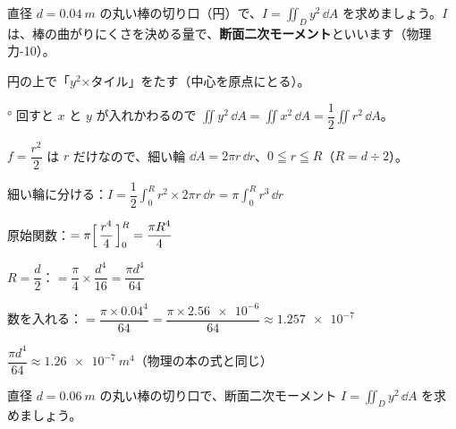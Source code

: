 \begin{reidai}[丸い棒の断面二次モーメント]
直径 $d=\qty{0.04}{m}$ の丸い棒の切り口（円）で、$I=\iint_D y^2\,\dd A$ を求めましょう。$I$ は、棒の曲がりにくさを決める量で、\textbf{断面二次モーメント}といいます（物理 力-10）。\par
\kangaekata {}\par
{}\enspace 円の上で「$y^2$×タイル」をたす（中心を原点にとる）。\par
{}° 回すと $x$ と $y$ が入れかわるので $\iint y^2\,\dd A=\iint x^2\,\dd A=\dfrac{1}{2}\iint r^2\,\dd A$。\par
{}\enspace $f=\dfrac{r^2}{2}$ は $r$ だけなので、細い輪 $\dd A=2\pi r\,\dd r$、$0\leqq r\leqq R$（$R=d\div2$）。\par
\shiki\kviiigs{}\zw{} 細い輪に分ける：$\displaystyle I=\dfrac{1}{2}\int_0^R r^2\times2\pi r\,\dd r=\pi\int_0^R r^3\,\dd r$\par
\kviiiga 原始関数：$\displaystyle =\pi\Bigl[\,\dfrac{r^4}{4}\,\Bigr]_0^R=\dfrac{\pi R^4}{4}$\par
\kviiiga $R=\dfrac{d}{2}$：$\displaystyle =\dfrac{\pi}{4}\times\dfrac{d^4}{16}=\dfrac{\pi d^4}{64}$\par
\kviiiga 数を入れる：$\displaystyle =\dfrac{\pi\times0.04^4}{64}=\dfrac{\pi\times\num{2.56e-6}}{64}\approx\num{1.257e-7}$\par
\kotae $\dfrac{\pi d^4}{64}\approx\qty{1.26e-7}{m^4}$（物理の本の式と同じ）
\end{reidai}

\begin{jibun}
直径 $d=\qty{0.06}{m}$ の丸い棒の切り口で、断面二次モーメント $I=\iint_D y^2\,\dd A$ を求めましょう。
\end{jibun}

